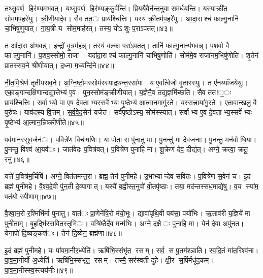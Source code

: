 तथ्सु॒वर्ण॒ हिर॑ण्यमभवत्। यथ्सु॒वर्ण॒ हिर॑ण्यङ्कु॒र्वन्ति॑। प्रि॒ययै॒वैन॑न्त॒नुवा॒ सम॑र्धयन्ति। यस्याक्री॑त॒ सोम॑मप॒हरे॑युः। क्री॒णी॒यादे॒व। सैव तत॒ः प्राय॑श्चित्तिः। यस्य॑ क्री॒तम॑प॒हरे॑युः। आ॒दा॒राश्च॑ फाल्गु॒नानि॑ चा॒भिषु॑णुयात्। गा॒य॒त्री य सोम॒माह॑रत्। तस्य॒ योऽशुः प॒राऽप॑तत्॥४३॥

त आ॑दा॒रा अ॑भवन्न्। इन्द्रो॑ वृ॒त्रम॑हन्न्। तस्य॑ व॒ल्कः परा॑ऽपतत्। तानि॑ फाल्गु॒नान्य॑भवन्न्। प॒शवो॒ वै फाल्गु॒नानि॑। प॒शव॒स्सोमो॒ राजा। यदा॑दा॒राश्च॑ फाल्गु॒नानि॑ चाभिषु॒णोति॑। सोम॑मे॒व राजा॑नम॒भिषु॑णोति। शृ॒तेन॑ प्रातस्सव॒ने श्री॑णीयात्। द॒ध्ना म॒ध्यन्दि॑ने॥४४॥

नी॒त॒मि॒श्रेण॑ तृतीयसव॒ने। अ॒ग्नि॒ष्टो॒मस्सोम॑स्स्याद्रथन्त॒रसा॑मा। य ए॒वर्त्विजो॑ वृ॒तास्स्युः। त ए॑नय्याँजयेयुः। एका॒ङ्गान्दक्षि॑णान्दद्या॒त्तेभ्य॑ ए॒व। पुन॒स्सोम॑ङ्क्रीणीयात्। य॒ज्ञेनै॒व तद्य॒ज्ञमि॑च्छति। सैव तत!॒ः प्राय॑श्चित्तिः। सर्वाभ्यो॒ वा ए॒ष दे॒वताभ्य॒स्सर्वेभ्यः पृ॒ष्ठेभ्य॑ आ॒त्मान॒मागु॑रते। यस्स॒त्त्राया॑गु॒रते। ए॒तावा॒न्खलु॒ वै पुरु॑षः। याव॑दस्य वि॒त्तम्। स॒र्व॒वे॒द॒सेन॑ यजेत। सर्व॑पृष्ठोऽस्य॒ सोम॑स्स्यात्। सर्वाभ्य ए॒व दे॒वताभ्य॒स्सर्वेभ्यः पृ॒ष्ठेभ्य॑ आ॒त्मान॒न्निष्क्री॑णीते॥४५॥


पव॑मान॒स्सुव॒र्जन॑ः। प॒वित्रे॑ण॒ विच॑ऱ्षणिः। यः पोता॒ स पु॑नातु मा। पु॒नन्तु॑ मा देवज॒नाः। पु॒नन्तु॒ मन॑वो धि॒या। पु॒नन्तु॒ विश्व॑ आ॒यव॑ः। जात॑वेदः प॒वित्र॑वत्। प॒वित्रे॑ण पुनाहि मा। शू॒क्रेण॑ देव॒ दीद्य॑त्। अग्ने॒ क्रत्वा॒ क्रतू॒ रनु॑॥४६॥

यत्ते॑ प॒वित्र॑म॒र्चिषि॑। अग्ने॒ वित॑तमन्त॒रा। ब्रह्म॒ तेन॑ पुनीमहे। उ॒भाभ्यान्देव सवितः। प॒वित्रे॑ण स॒वेन॑ च। इ॒दं ब्रह्म॑ पुनीमहे। वै॒श्व॒दे॒वी पु॑न॒ती दे॒व्यागात्। यस्यै॑ ब॒ह्वीस्त॒नुवो॑ वी॒तपृ॑ष्ठाः। तया॒ मद॑न्तस्सध॒माद्ये॑षु। व॒य स्या॑म॒ पत॑यो रयी॒णाम्॥४७॥

वै॒श्वा॒न॒रो र॒श्मिभि॑र्मा पुनातु। वात॑ः प्रा॒णेने॑षि॒रो म॑यो॒भूः। द्यावा॑पृथि॒वी पय॑सा॒ पयो॑भिः। ऋ॒ताव॑री य॒ज्ञिये॑ मा पुनीताम्। बृ॒हद्भि॑स्सवित॒स्तृभि॑ः। वऱ्षि॑ष्ठैर्देव॒ मन्म॑भिः। अग्ने॒ दक्षैः पुनाहि मा। येन॑ दे॒वा अपु॑नत। येनापो॑ दि॒व्यङ्कश॑ः। तेन॑ दि॒व्येन॒ ब्रह्म॑णा॥४८॥

इ॒दं ब्रह्म॑ पुनीमहे। यः पा॑वमा॒नीर॒ध्येति॑। ऋषि॑भि॒स्संभृ॑त॒ रसम्। सर्व॒ स पू॒तम॑श्ञाति। स्व॒दि॒तं मा॑त॒रिश्व॑ना। पा॒व॒मा॒नीर्यो अ॒ध्येति॑। ऋषि॑भि॒स्संभृ॑त॒ रसम्। तस्मै॒ सर॑स्वती दुहे। क्षी॒र स॒र्पिर्मधू॑द॒कम्। पा॒व॒मा॒नीस्स्व॒स्त्यय॑नीः॥४९॥

